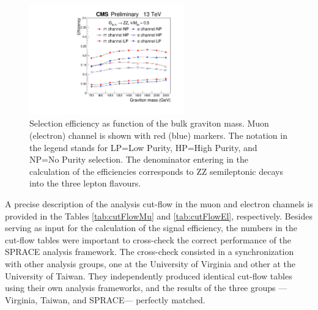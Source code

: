 \clearpage
\begin{figure}[hbt!!]
\begin{center}
\includegraphics[width=0.60\textwidth]{figures/objects/signalEfficiency.pdf}
\caption[Selection efficiency]{Selection efficiency as function of the bulk graviton mass. Muon (electron) channel is shown with red (blue) markers. The notation in the legend stands for LP=Low Purity, HP=High Purity, and NP=No Purity selection. The denominator entering in the calculation of the efficiencies corresponds to ZZ semileptonic decays into the three lepton flavours.}
\label{selectionEff_VZ}
\end{center}
\end{figure}

A precise description of the analysis cut-flow in the muon and electron channels is provided in the Tables \ref{tab:cutFlowMu} and \ref{tab:cutFlowEl}, respectively. Besides serving as input for the calculation of the signal efficiency, the numbers in the cut-flow tables were important to cross-check the correct performance of the SPRACE analysis framework. The cross-check consisted in a synchronization with other analysis groups, one at the University of Virginia and other at the University of Taiwan. They independently produced identical cut-flow tables using their own analysis frameworks, and the results of the three groups ---Virginia, Taiwan, and SPRACE--- perfectly matched. 

